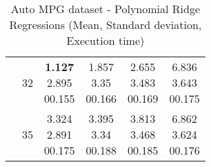 \begin{center}
\begin{table}
\begin{tabular}{|c|c|c|c|c|c|}
\cline{2-6} & 32 & \minibox{\textbf{1.127} \\ 2.895 \\ 00.155} & \minibox{1.857 \\ 3.35 \\ 00.166} & \minibox{2.655 \\ 3.483 \\ 00.169} & \minibox{6.836 \\ 3.643 \\ 00.175} \\

\cline{2-6} & 35 & \minibox{3.324 \\ 2.891 \\ 00.175} & \minibox{3.395 \\ 3.34 \\ 00.188} & \minibox{3.813 \\ 3.468 \\ 00.185} & \minibox{6.862 \\ 3.624 \\ 00.176} \\

\hline
\end{tabular}

    \caption{Auto MPG dataset - Polynomial Ridge Regressions (Mean, Standard deviation, Execution time)}
    \label{table:db1-polynomialregression}
    \end{table}
\end{center}

